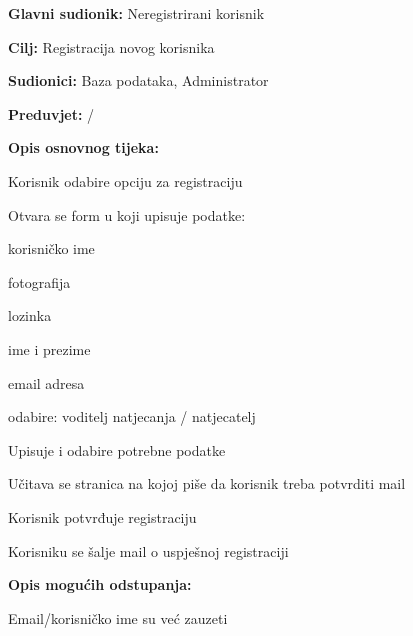 						\noindent {}
					\begin{packed_item}
						
						\item \textbf{Glavni sudionik: } Neregistrirani korisnik
						\item  \textbf{Cilj:} Registracija novog korisnika
						\item  \textbf{Sudionici:} Baza podataka, Administrator
						\item  \textbf{Preduvjet:}  / 
						\item  \textbf{Opis osnovnog tijeka:}
						
						\item[] \begin{packed_enum}
							\item Korisnik odabire opciju za registraciju
							\item Otvara se form u koji upisuje podatke:
							\item[] \begin{packed_enum}
								
								\item korisničko ime
								\item fotografija
								\item lozinka
								\item ime i prezime
								\item email adresa
								\item odabire: voditelj natjecanja / natjecatelj
								
							\end{packed_enum}
							\item Upisuje i odabire potrebne podatke			
							\item Učitava se stranica na kojoj piše da korisnik treba potvrditi mail
							\item Korisnik potvrđuje registraciju
							\item Korisniku se šalje mail o uspješnoj registraciji
						\end{packed_enum}
						
						\item  \textbf{Opis mogućih odstupanja:}
						
						\item[] \begin{packed_item}
							
							\item[2.a]Email/korisničko ime su već zauzeti
							\item[] \begin{packed_enum}
								

\end{packed_enum}
\end{packed_item}
\end{packed_item}
